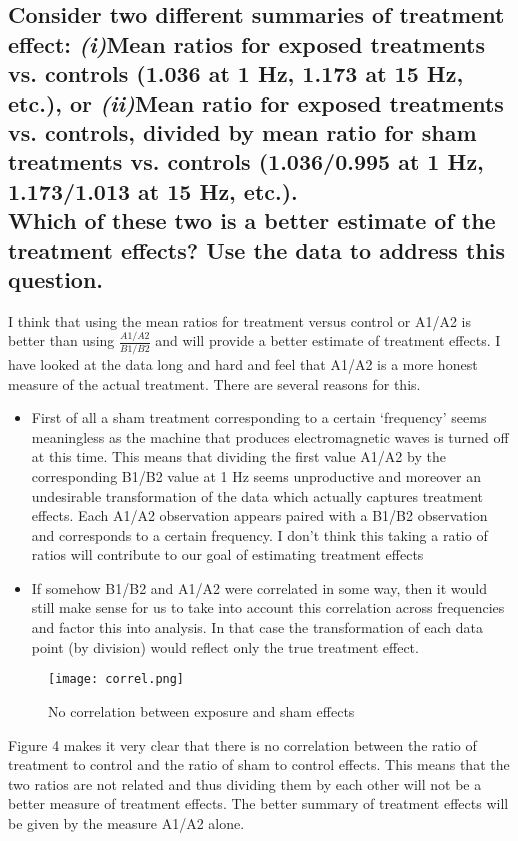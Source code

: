 \documentclass{article}
\begin{document}
\subsection{ Consider two different summaries of treatment effect: \emph{(i)}Mean ratios for exposed treatments vs. controls (1.036 at 1 Hz, 1.173 at 15 Hz, etc.), or \emph{(ii)}Mean ratio for exposed treatments vs. controls, divided by mean ratio for sham treatments vs. controls (1.036/0.995 at 1 Hz, 1.173/1.013 at 15 Hz, etc.).\\Which of these two is a better estimate of the treatment effects? Use the data to address this question.}
I think that using the mean ratios for treatment versus control or A1/A2 is better than using $\frac{A1/A2}{B1/B2}$ and will provide a better estimate of treatment effects. I have  looked at the data long and hard and feel that A1/A2 is a more honest measure of the actual treatment. There are several reasons for this. 
\begin{itemize}
\item{First of all a sham treatment corresponding to a certain `frequency' seems meaningless as the machine that produces electromagnetic waves is turned off at this time. This means that dividing the first value A1/A2 by the corresponding B1/B2 value at 1 Hz seems unproductive and moreover an undesirable transformation of the data which actually captures treatment effects. Each A1/A2 observation appears paired with a B1/B2 observation and corresponds to a certain frequency. I don't think this taking a ratio of ratios will contribute to our goal of estimating treatment effects}
\item{If somehow B1/B2 and A1/A2 were correlated in some way, then it would still make sense for us to take into account this correlation across frequencies and factor this into analysis. In that case the transformation of each data point (by division) would reflect only the true treatment effect.}
\end{itemize}
 \begin{figure}[H]
\centering
\texttt{[image: correl.png]}
\caption{No correlation between exposure and sham effects}
\label{deltat}
\end{figure}
Figure 4 makes it very clear that there is no correlation between the ratio of treatment to control and the ratio of sham to control effects. This means that the two ratios are not related and thus dividing them by each other will not be a better measure of treatment effects. The better summary of treatment effects will be given by the measure A1/A2 alone.
\end{document}
